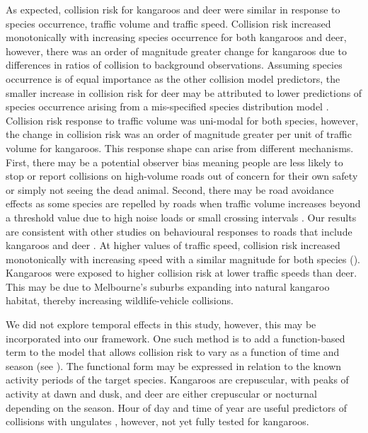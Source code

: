 As expected, collision risk for kangaroos and deer were similar in response to species occurrence, traffic volume and traffic speed.  Collision risk increased monotonically with increasing species occurrence for both kangaroos and deer, however, there was an order of magnitude greater change for kangaroos due to differences in ratios of collision to background observations.  Assuming species occurrence is of equal importance as the other collision model predictors, the smaller increase in collision risk for deer may be attributed to lower predictions of species occurrence arising from a mis-specified species distribution model \citep[see][]{guil15}.  Collision risk response to traffic volume was uni-modal for both species, however, the change in collision risk was an order of magnitude greater per unit of traffic volume for kangaroos.  This response shape can arise from different mechanisms.  First, there may be a potential observer bias meaning people are less likely to stop or report collisions on high-volume roads out of concern for their own safety or simply not seeing the dead animal.  Second, there may be road avoidance effects as some species are repelled by roads when traffic volume increases beyond a threshold value due to high noise loads or small crossing intervals \citep[see][]{vanl04,seil05,gagn07}.  Our results are consistent with other studies on behavioural responses to roads that include kangaroos and deer \citep[see][]{jaco16}.  At higher values of traffic speed, collision risk increased monotonically with increasing speed with a similar magnitude for both species ().  Kangaroos were exposed to higher collision risk at lower traffic speeds than deer.  This may be due to Melbourne's suburbs expanding into natural kangaroo habitat, thereby increasing wildlife-vehicle collisions.

We did not explore temporal effects in this study, however, this may be incorporated into our framework.  One such method is to add a function-based term to the model that allows collision risk to vary as a function of time and season (see ). The functional form may be expressed in relation to the known activity periods of the target species. Kangaroos are crepuscular, with peaks of activity at dawn and dusk, and deer are either crepuscular or nocturnal depending on the season.  Hour of day and time of year are useful predictors of collisions with ungulates \citep{meis14,moun09}, however, not yet fully tested for kangaroos.

